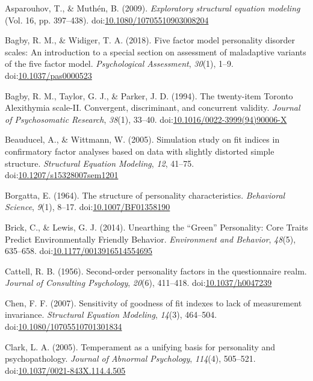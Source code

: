 \documentclass[,man,floatsintext]{apa6}
\begin{document}
\hypertarget{ref-AsparouhovMuthen2009}{}
Asparouhov, T., \& Muthén, B. (2009). \emph{Exploratory structural
equation modeling} (Vol. 16, pp. 397--438).
doi:\href{https://doi.org/10.1080/10705510903008204}{10.1080/10705510903008204}

\hypertarget{ref-Bagby2018}{}
Bagby, R. M., \& Widiger, T. A. (2018). Five factor model personality
disorder scales: An introduction to a special section on assessment of
maladaptive variants of the five factor model. \emph{Psychological
Assessment}, \emph{30}(1), 1--9.
doi:\href{https://doi.org/10.1037/pas0000523}{10.1037/pas0000523}

\hypertarget{ref-Bagby1994}{}
Bagby, R. M., Taylor, G. J., \& Parker, J. D. (1994). The twenty-item
Toronto Alexithymia scale-II. Convergent, discriminant, and concurrent
validity. \emph{Journal of Psychosomatic Research}, \emph{38}(1),
33--40.
doi:\href{https://doi.org/10.1016/0022-3999(94)90006-X}{10.1016/0022-3999(94)90006-X}

\hypertarget{ref-Beauducel2005}{}
Beauducel, A., \& Wittmann, W. (2005). Simulation study on fit indices
in confirmatory factor analyses based on data with slightly distorted
simple structure. \emph{Structural Equation Modeling}, \emph{12},
41--75.
doi:\href{https://doi.org/10.1207/s15328007sem1201}{10.1207/s15328007sem1201}

\hypertarget{ref-Borgatta1964}{}
Borgatta, E. (1964). The structure of personality characteristics.
\emph{Behavioral Science}, \emph{9}(1), 8--17.
doi:\href{https://doi.org/10.1007/BF01358190}{10.1007/BF01358190}

\hypertarget{ref-Brick2014}{}
Brick, C., \& Lewis, G. J. (2014). Unearthing the ``Green'' Personality:
Core Traits Predict Environmentally Friendly Behavior. \emph{Environment
and Behavior}, \emph{48}(5), 635--658.
doi:\href{https://doi.org/10.1177/0013916514554695}{10.1177/0013916514554695}

\hypertarget{ref-Cattell1956}{}
Cattell, R. B. (1956). Second-order personality factors in the
questionnaire realm. \emph{Journal of Consulting Psychology},
\emph{20}(6), 411--418.
doi:\href{https://doi.org/10.1037/h0047239}{10.1037/h0047239}

\hypertarget{ref-Chen2007}{}
Chen, F. F. (2007). Sensitivity of goodness of fit indexes to lack of
measurement invariance. \emph{Structural Equation Modeling},
\emph{14}(3), 464--504.
doi:\href{https://doi.org/10.1080/10705510701301834}{10.1080/10705510701301834}

\hypertarget{ref-Clark2005}{}
Clark, L. A. (2005). Temperament as a unifying basis for personality and
psychopathology. \emph{Journal of Abnormal Psychology}, \emph{114}(4),
505--521.
doi:\href{https://doi.org/10.1037/0021-843X.114.4.505}{10.1037/0021-843X.114.4.505}
\end{document}
